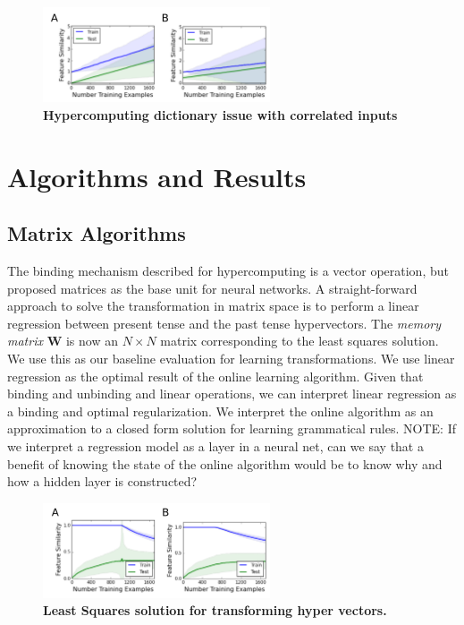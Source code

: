 \documentclass{article}
\begin{document}
\begin{figure}
\centering
\includegraphics[width=0.6\textwidth]{dictionary_issue-170518.png}
\caption{\textbf{Hypercomputing dictionary issue with correlated inputs}}
\end{figure}

\section{Algorithms and Results}

\subsection{Matrix Algorithms}

The binding mechanism described for hypercomputing is a vector operation, but \citet{Rumelhart1986a} proposed matrices as the base unit for neural networks. A straight-forward approach to solve the transformation in matrix space is to perform a linear regression between present tense and the past tense hypervectors. The \emph{memory matrix} $\mathbf{W}$ is now an $N \times N$ matrix corresponding to the least squares solution. We use this as our baseline evaluation for learning transformations. We use linear regression as the optimal result of the online learning algorithm. Given that binding and unbinding and linear operations, we can interpret linear regression as a binding and optimal regularization. We interpret the online algorithm as an approximation to a closed form solution for learning grammatical rules. 
NOTE: If we interpret a regression model as a layer in a neural net, can we say that a benefit of knowing the state of the online algorithm would be to know why and how a hidden layer is constructed?

\begin{figure}
\centering
\includegraphics[width=0.6\textwidth]{regression_issue-170518.png}
\caption{\textbf{Least Squares solution for transforming hyper vectors.}}
\end{figure}
\end{document}
